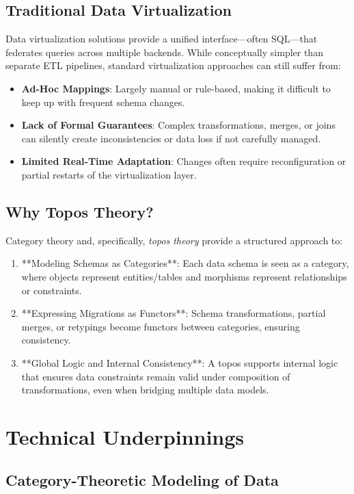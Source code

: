 \documentclass[11pt]{article}
\begin{document}
\subsection{Traditional Data Virtualization}
Data virtualization solutions provide a unified interface—often SQL—that federates queries across multiple backends. While conceptually simpler than separate ETL pipelines, standard virtualization approaches can still suffer from:
\begin{itemize}
\item \textbf{Ad-Hoc Mappings}: Largely manual or rule-based, making it difficult to keep up with frequent schema changes.
\item \textbf{Lack of Formal Guarantees}: Complex transformations, merges, or joins can silently create inconsistencies or data loss if not carefully managed.
\item \textbf{Limited Real-Time Adaptation}: Changes often require reconfiguration or partial restarts of the virtualization layer.
\end{itemize}

\subsection{Why Topos Theory?}
Category theory and, specifically, \emph{topos theory} provide a structured approach to:
\begin{enumerate}
\item **Modeling Schemas as Categories**: Each data schema is seen as a category, where objects represent entities/tables and morphisms represent relationships or constraints.
\item **Expressing Migrations as Functors**: Schema transformations, partial merges, or retypings become functors between categories, ensuring consistency.
\item **Global Logic and Internal Consistency**: A topos supports internal logic that ensures data constraints remain valid under composition of transformations, even when bridging multiple data models.
\end{enumerate}

\section{Technical Underpinnings}
\label{sec:tech_details}

\subsection{Category-Theoretic Modeling of Data}
\end{document}

